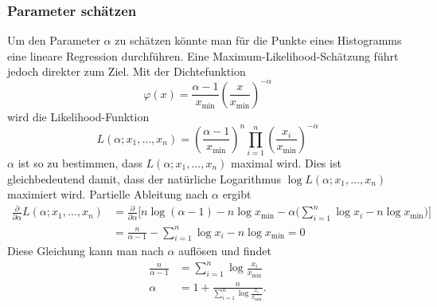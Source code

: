 \subsubsection{Parameter schätzen}
Um den Parameter $\alpha$ zu schätzen könnte man für die Punkte
eines Histogramms eine lineare Regression durchführen.
Eine Maximum-Likelihood-Schätzung führt jedoch direkter zum
Ziel.
Mit der Dichtefunktion
\[
\varphi(x)=\frac{\alpha-1}{x_{\min}}\left(\frac{x}{x_{\min}}\right)^{-\alpha}
\]
wird die Likelihood-Funktion
\[
L(\alpha;x_1,\dots,x_n)=
\left(\frac{\alpha-1}{x_{\min}}\right)^n
\prod_{i=1}^n
\left(\frac{x_i}{x_{\min}}\right)^{-\alpha}
\]
$\alpha$ ist so zu bestimmen, dass $L(\alpha;x_1,\dots,x_n)$ maximal
wird.
Dies ist gleichbedeutend damit, dass der natürliche 
Logarithmus $\log L(\alpha;x_1,\dots,x_n)$ maximiert wird.
Partielle Ableitung nach $\alpha$ ergibt
\begin{align*}
\frac{\partial}{\partial \alpha}
L(\alpha;x_1,\dots,x_n)
&=
\frac{\partial}{\partial\alpha}
\biggl[
n\log(\alpha-1)-n\log x_{\min}
-\alpha\biggl( \sum_{i=1}^n\log x_i-n \log x_{\min}\biggr)
\biggr]
\\
&=
\frac{n}{\alpha-1}-\sum_{i=1}^n\log x_i-n\log x_{\min}=0
\end{align*}
Diese Gleichung kann man nach $\alpha$ auflösen und findet
\begin{align*}
\frac{n}{\alpha-1}
&=
\sum_{i=1}^n \log\frac{x_i}{x_{\min}}
\\
\alpha&=1+\frac{n}{
\sum_{i=1}^n \log\frac{x_i}{x_{\min}}
}.
\end{align*}


